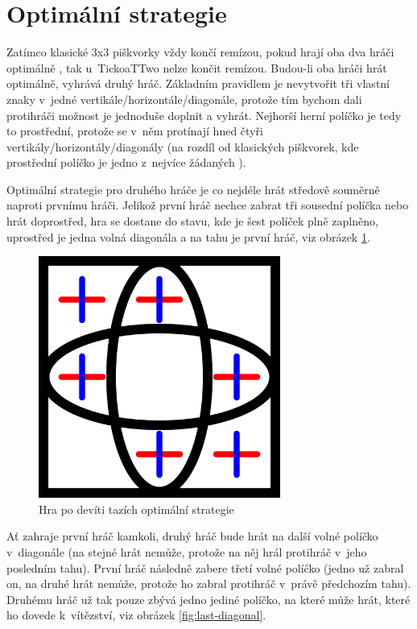 
\section{Optimální strategie}
Zatímco klasické 3x3 piškvorky vždy končí remízou, pokud hrají oba dva hráči optimálně
\cite{crowley1993}, tak u~TickoaTTwo nelze končit remízou. Budou-li oba hráči hrát
optimálně, vyhrává druhý hráč. Základním pravidlem je nevytvořit tři vlastní
znaky v~jedné vertikále/horizontále/diagonále, protože tím bychom dali
protihráči možnost je jednoduše doplnit a vyhrát. Nejhorší herní políčko je
tedy to prostřední, protože se v~něm protínají hned čtyři
vertikály/horizontály/diagonály (na rozdíl od klasických piškvorek, kde
prostřední políčko je jedno z~nejvíce žádaných \cite{xkcd832}).

Optimální strategie pro druhého hráče je co nejdéle hrát středově souměrně
naproti prvnímu hráči. Jelikož první hráč nechce zabrat tři sousední políčka
nebo hrát doprostřed, hra se dostane do stavu, kde je šest políček plně
zaplněno, uprostřed je jedna volná diagonála a na tahu je první hráč, viz
obrázek \ref{fig:empty-diagonal}.

\begin{figure}[h]
    \centering
    \includegraphics[width=300px]{img/empty-diagonal.png}
    \caption{Hra po devíti tazích optimální strategie}
    \label{fig:empty-diagonal}
\end{figure}

Ať zahraje první hráč kamkoli, druhý hráč bude hrát na další volné políčko
v~diagonále (na stejné hrát nemůže, protože na něj hrál protihráč v~jeho
posledním tahu). První hráč následně zabere třetí volné políčko (jedno už
zabral on, na druhé hrát nemůže, protože ho zabral protihráč v~právě předchozím
tahu). Druhému hráč už tak pouze zbývá jedno jediné políčko, na které může
hrát, které ho dovede k~vítězství, viz obrázek \ref{fig:last-diagonal}.


